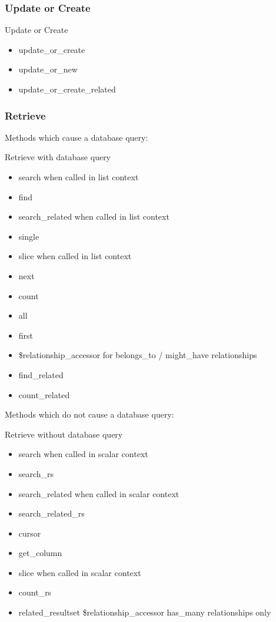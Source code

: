 \subsubsection{Update or Create}

\begin{frame}{Update or Create}
\begin{itemize}
\item update\_or\_create
\item update\_or\_new
\item update\_or\_create\_related
\end{itemize}
\end{frame}

\subsubsection{Retrieve}

Methods which cause a database query:

\begin{frame}{Retrieve with database query}
\begin{itemize}
\item search when called in list context
\item find
\item search\_related when called in list context
\item single
\item slice when called in list context
\item next
\item count
\item all
\item first
\item \$relationship\_accessor for belongs\_to / might\_have relationships
\item find\_related
\item count\_related
\end{itemize}
\end{frame}

Methods which do not cause a database query:

\begin{frame}{Retrieve without database query}
\begin{itemize}
\item search when called in scalar context
\item search\_rs
\item search\_related when called in scalar context
\item search\_related\_rs
\item cursor
\item get\_column
\item slice when called in scalar context
\item count\_rs
\item related\_resultset
\$relationship\_accessor has\_many relationships only
\end{itemize}
\end{frame}

